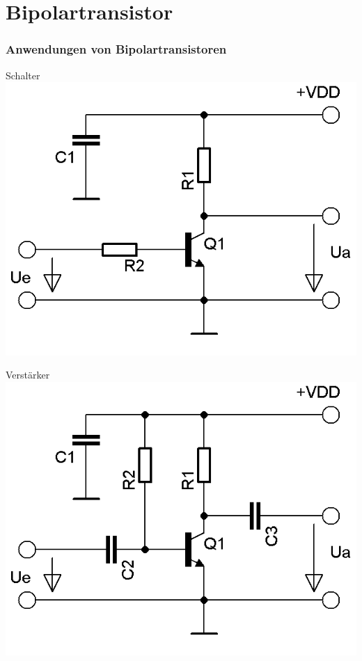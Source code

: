 \section*{Bipolar\-transistor}
\begin{frame}
  \frametitle{Anwendungen von Bipolartransistoren}
  \begin{minipage}{0.4\textwidth}
    \begin{center}
      {\Large Schalter}
      \includegraphics[width=\textwidth,height=.7\textheight,keepaspectratio]{a06/Transistor-Schalter.png}\\
    \end{center}
  \end{minipage}
  \hspace{3mm}
  \begin{minipage}{0.4\textwidth}
    \begin{center}
      {\Large Verstärker}
      \includegraphics[width=\textwidth,height=.7\textheight,keepaspectratio]{a06/Transistor-Verstaerker.png}\\

\end{center}
\end{minipage}
\end{frame}
